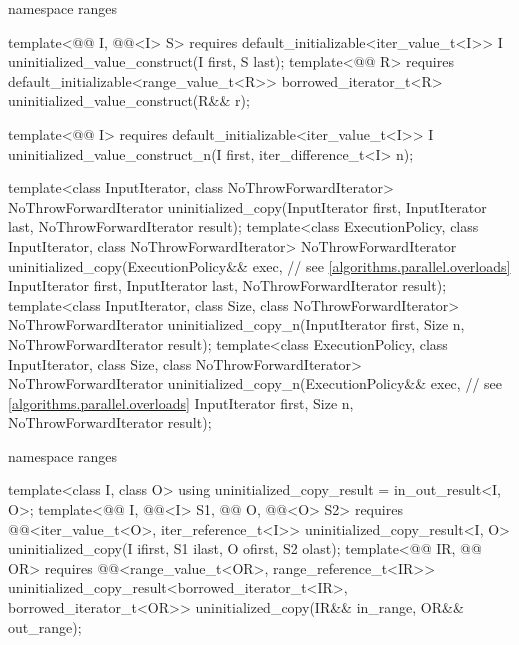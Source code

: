 \begin{codeblock}
{  namespace ranges {
    template<@@ I, @@<I> S>
      requires default_initializable<iter_value_t<I>>
        I uninitialized_value_construct(I first, S last);
    template<@@ R>
      requires default_initializable<range_value_t<R>>
        borrowed_iterator_t<R> uninitialized_value_construct(R&& r);

    template<@@ I>
      requires default_initializable<iter_value_t<I>>
        I uninitialized_value_construct_n(I first, iter_difference_t<I> n);
  }

  template<class InputIterator, class NoThrowForwardIterator>
    NoThrowForwardIterator uninitialized_copy(InputIterator first, InputIterator last,
                                              NoThrowForwardIterator result);
  template<class ExecutionPolicy, class InputIterator, class NoThrowForwardIterator>
    NoThrowForwardIterator uninitialized_copy(ExecutionPolicy&& exec,   // see \ref{algorithms.parallel.overloads}
                                              InputIterator first, InputIterator last,
                                              NoThrowForwardIterator result);
  template<class InputIterator, class Size, class NoThrowForwardIterator>
    NoThrowForwardIterator uninitialized_copy_n(InputIterator first, Size n,
                                                NoThrowForwardIterator result);
  template<class ExecutionPolicy, class InputIterator, class Size, class NoThrowForwardIterator>
    NoThrowForwardIterator uninitialized_copy_n(ExecutionPolicy&& exec, // see \ref{algorithms.parallel.overloads}
                                                InputIterator first, Size n,
                                                NoThrowForwardIterator result);

  namespace ranges {
    template<class I, class O>
      using uninitialized_copy_result = in_out_result<I, O>;
    template<@@ I, @@<I> S1,
             @@ O, @@<O> S2>
      requires @@<iter_value_t<O>, iter_reference_t<I>>
        uninitialized_copy_result<I, O>
          uninitialized_copy(I ifirst, S1 ilast, O ofirst, S2 olast);
    template<@@ IR, @@ OR>
      requires @@<range_value_t<OR>, range_reference_t<IR>>
        uninitialized_copy_result<borrowed_iterator_t<IR>, borrowed_iterator_t<OR>>
          uninitialized_copy(IR&& in_range, OR&& out_range);

}}
\end{codeblock}
